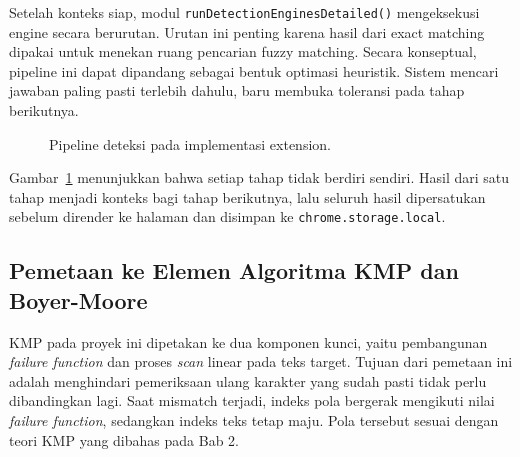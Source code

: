 Setelah konteks siap, modul \texttt{runDetectionEnginesDetailed()} mengeksekusi engine secara berurutan. Urutan ini penting karena hasil dari exact matching dipakai untuk menekan ruang pencarian fuzzy matching. Secara konseptual, pipeline ini dapat dipandang sebagai bentuk optimasi heuristik. Sistem mencari jawaban paling pasti terlebih dahulu, baru membuka toleransi pada tahap berikutnya.

\begin{figure}[H]
    \centering
    \caption{Pipeline deteksi pada implementasi extension.}
    \label{fig:pipeline-deteksi-bab3}
\end{figure}

Gambar~\ref{fig:pipeline-deteksi-bab3} menunjukkan bahwa setiap tahap tidak berdiri sendiri. Hasil dari satu tahap menjadi konteks bagi tahap berikutnya, lalu seluruh hasil dipersatukan sebelum dirender ke halaman dan disimpan ke \texttt{chrome.storage.local}.

\subsection{Pemetaan ke Elemen Algoritma KMP dan Boyer-Moore}

KMP pada proyek ini dipetakan ke dua komponen kunci, yaitu pembangunan \textit{failure function} dan proses \textit{scan} linear pada teks target. Tujuan dari pemetaan ini adalah menghindari pemeriksaan ulang karakter yang sudah pasti tidak perlu dibandingkan lagi. Saat mismatch terjadi, indeks pola bergerak mengikuti nilai \textit{failure function}, sedangkan indeks teks tetap maju. Pola tersebut sesuai dengan teori KMP yang dibahas pada Bab 2.

